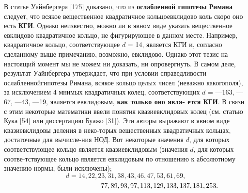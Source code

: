 В статье Уайнбергера [175] доказано, что из \textbf{ослабленной гипотезы\linebreak
Римана} следует, что всякое вещественное квадратичное кольцо\linebreak евклидово коль скоро оно есть \textbf{КГИ}. Однако неизвестно, можно ли в явном\linebreak
виде указать вещественное евклидово квадратичное кольцо, не \linebreak фигурирующее в данном месте. Например, квадратичное кольцо, \linebreak соответствующее $d$ = 14, является КГИ и, согласно сделанному выше примечанию, возможно, евклидово. Однако этот тезис на настоящий момент
мы не можем ни доказать, ни опровергнуть. В самом деле, результат\linebreak
Уайнбергера утверждает, что при условии справедливости ослабленной\linebreak гипотезы Римана, всякое кольцо целых чисел (неважно какого\linebreak поля), за исключением 4 мнимых квадратичных колец, соответствующих\linebreak
$d$ = —163, —67, —43, —19, является евклидовым, \textbf{как только оно явля-\linebreak
ется КГИ}.\newline
\hspace*{10pt} В связи с этим некоторые математики ввели понятия квазиевклидовых колец (см. статью Кука [54] или диссертацию Буажо [31]). Эти\linebreak
авторы выражают в явном виде квазиевклидовы деления в неко-\linebreak торых вещественных квадратичных кольцах, достаточные для вычисле-\linebreak ния НОД. Вот некоторые значения $d$, для которых соответствующее
кольцо является квазиевклидовым (значения $d$, для которых соотве-\linebreak тствующее кольцо является евклидовым по отношению к абсолютному\linebreak
значению нормы, были исключены);
$$d = 14,22,23,31,38,43,46,47,53,61,69,$$
$$\hspace*{100pt}77,89,93,97,113,129,133,137,181,253.$$\linebreak\pagebreak



